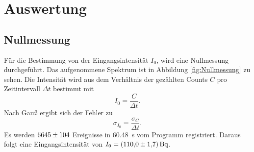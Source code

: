 \newpage
\section{Auswertung}
\label{sec:Auswertung}
\subsection{Nullmessung}
Für die Bestimmung von der Eingangsintensität $I_0$, wird eine Nullmessung durchgeführt.
Das aufgenommene Spektrum ist in Abbildung \ref{fig:Nullmessung} zu sehen.
Die Intensität wird aus dem Verhältnis der gezählten Counts $C$ pro Zeitintervall $\Delta t$ bestimmt mit
\begin{equation}
    I_0=\frac{C}{\Delta t}.
\end{equation}
Nach Gauß ergibt sich der Fehler zu
\begin{equation}
    \sigma_{I_0}=\frac{\sigma_C}{\Delta t}.
\end{equation}
Es werden $\num{6645\pm104}$ Ereignisse in \SI{60,48}{\second} vom Programm registriert.
Daraus folgt eine Eingangsintensität von $I_0=\SI{110.0\pm1.7}{\becquerel}$.

